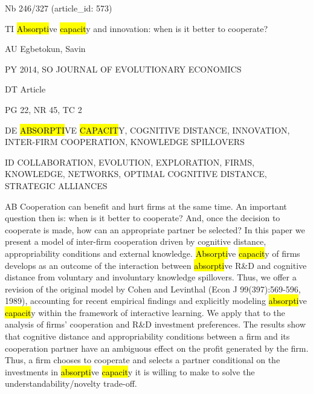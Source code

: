 \documentclass[a4paper]{article}
\begin{document}
\vspace*{-2cm}
Nb \tabto{0cm}246/327 (article\_id: 573)\par
TI \tabto{0cm}\hl{Absorpti}ve \hl{capacit}y and innovation: when is it better to cooperate?\par
AU \tabto{0cm}Egbetokun, Savin\par
PY \tabto{0cm}2014, SO JOURNAL OF EVOLUTIONARY ECONOMICS\par
DT \tabto{0cm}Article\par
PG \tabto{0cm}22, NR 45, TC 2\par
DE \tabto{0cm}\hl{ABSORPTI}VE \hl{CAPACIT}Y, COGNITIVE DISTANCE, INNOVATION, INTER-FIRM COOPERATION, KNOWLEDGE SPILLOVERS\par
ID \tabto{0cm}COLLABORATION, EVOLUTION, EXPLORATION, FIRMS, KNOWLEDGE, NETWORKS, OPTIMAL COGNITIVE DISTANCE, STRATEGIC ALLIANCES\par
AB \tabto{0cm}Cooperation can benefit and hurt firms at the same time. An important question then is: when is it better to cooperate? And, once the decision to cooperate is made, how can an appropriate partner be selected? In this paper we present a model of inter-firm cooperation driven by cognitive distance, appropriability conditions and external knowledge. \hl{Absorpti}ve \hl{capacit}y of firms develops as an outcome of the interaction between \hl{absorpti}ve R\&D and cognitive distance from voluntary and involuntary knowledge spillovers. Thus, we offer a revision of the original model by Cohen and Levinthal (Econ J 99(397):569-596, 1989), accounting for recent empirical findings and explicitly modeling \hl{absorpti}ve \hl{capacit}y within the framework of interactive learning. We apply that to the analysis of firms' cooperation and R\&D investment preferences. The results show that cognitive distance and appropriability conditions between a firm and its cooperation partner have an ambiguous effect on the profit generated by the firm. Thus, a firm chooses to cooperate and selects a partner conditional on the investments in \hl{absorpti}ve \hl{capacit}y it is willing to make to solve the understandability/novelty trade-off.\par
\clearpage
\end{document}
